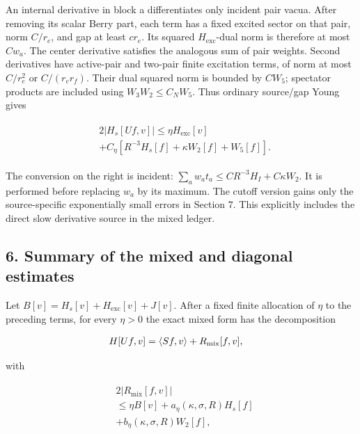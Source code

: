 An internal derivative in block a differentiates only incident pair
vacua. After removing its scalar Berry part, each term has a fixed
excited sector on that pair, norm \(C/r_{e}\), and gap at least
\(c r_{e}\). Its squared \(H_{\mathrm{exc}}\)-dual norm is therefore at
most \(C w_{a}\). The center derivative satisfies the analogous sum of
pair weights. Second derivatives have active-pair and two-pair finite
excitation terms, of norm at most \(C/r_{e}^{2}\) or
\(C/(r_{e} r_{f})\). Their dual squared norm is bounded by \(C W_{5}\);
spectator products are included using \(W_{3}W_{2}\le C_{N}W_{5}\). Thus
ordinary source/gap Young gives

\begin{gather*}
\begin{aligned}
& 2\vert H_{s}[Uf,v]\vert  \le  \eta  H_{\mathrm{exc}}[v] \\
& +C_{\eta}[R^{-3}H_{s}[f]+\kappa  W_{2}[f]+W_{5}[f]].
\end{aligned}\tag{5.8}
\end{gather*}

The conversion on the right is incident:
\(\sum _{a} w_{a} t_{a}\le C R^{-3}H_{I}+C \kappa  W_{2}\). It is
performed before replacing \(w_{a}\) by its maximum. The cutoff version
gains only the source-specific exponentially small errors in Section
\(7\). This explicitly includes the direct slow derivative source in the
mixed ledger.

\subsection{6. Summary of the mixed and diagonal
estimates}\label{i-summary-of-the-mixed-and-diagonal-estimates}

Let \(B[v]=H_{s}[v]+H_{\mathrm{exc}}[v]+J[v]\). After a fixed finite
allocation of \(\eta\) to the preceding terms, for every \(\eta >0\) the
exact mixed form has the decomposition

\begin{gather*}
\begin{aligned}
& H[Uf,v]=\langle Sf,v\rangle +R_{\mathrm{mix}}[f,v],
\end{aligned}\notag
\end{gather*}

with

\begin{gather*}
\begin{aligned}
& 2\vert R_{\mathrm{mix}}[f,v]\vert \\
& \le \eta  B[v]+a_{\eta}(\kappa ,\sigma ,R)H_{s}[f] \\
& +b_{\eta}(\kappa ,\sigma ,R)W_{2}[f],
\end{aligned}\tag{6.1}
\end{gather*}

